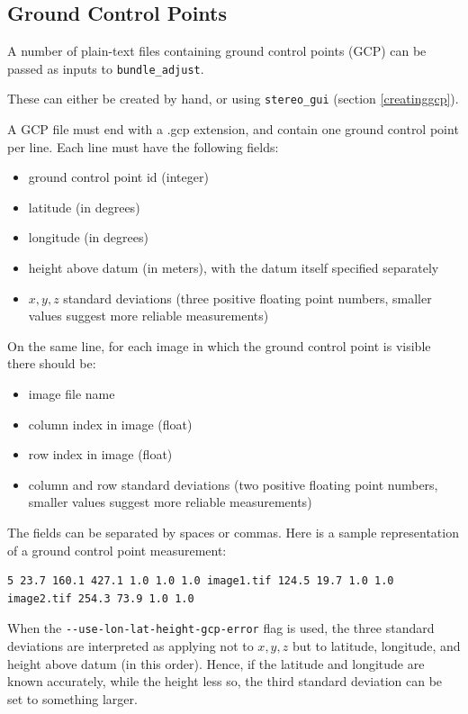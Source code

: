 \subsection{Ground Control Points}
\label{bagcp}

A number of plain-text files containing ground control points (GCP) can be
passed as inputs to \texttt{bundle\_adjust}.

These can either be created by hand, or using \texttt{stereo\_gui}
(section \ref{creatinggcp}).

A GCP file must end with a .gcp extension, and contain one ground
control point per line. Each line must have the following fields:
\begin{itemize}
\item ground control point id (integer)
\item latitude (in degrees)
\item longitude (in degrees)
\item height above datum (in meters), with the datum itself specified separately
\item $x, y, z$ standard deviations (three positive floating point
  numbers, smaller values suggest more reliable measurements)
\end{itemize}

On the same line, for each image in which the ground control point is
visible there should be:

\begin{itemize}
\item image file name
\item column index in image (float)
\item row index in image (float)
\item column and row standard deviations (two positive floating point
  numbers, smaller values suggest more reliable measurements)
\end{itemize}

The fields can be separated by spaces or commas. Here is a sample representation
of a ground control point measurement:

\begin{verbatim}
5 23.7 160.1 427.1 1.0 1.0 1.0 image1.tif 124.5 19.7 1.0 1.0 image2.tif 254.3 73.9 1.0 1.0
\end{verbatim}

When the \texttt{-\/-use-lon-lat-height-gcp-error} flag is used, the
three standard deviations are interpreted as applying not to $x, y, z$
but to latitude, longitude, and height above datum (in this
order). Hence, if the latitude and longitude are known accurately, while
the height less so, the third standard deviation can be set to something
larger.

